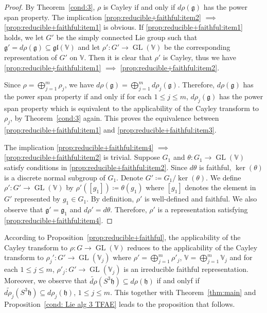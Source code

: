 \documentclass[11pt,reqno]{amsart}
\DeclareMathOperator{\GL}{GL}
\begin{document}
\begin{proof}
By Theorem~\ref{cond:3},  $\rho$ is Cayley if and only if $d \rho(\mathfrak{g})$ has the power span property.  The implication \eqref{prop:reducible+faithful:item2} $\implies$ \eqref{prop:reducible+faithful:item1} is obvious.  If \eqref{prop:reducible+faithful:item1} holds,  we let $G'$ be the simply connected Lie group such that $\mathfrak{g}' = d \rho(\mathfrak{g}) \subseteq \mathfrak{gl}(\mathbb{V})$ and let $\rho': G' \to \GL(\mathbb{V})$ be the corresponding representation of $G'$ on $\mathbb{V}$.  Then it is clear that $\rho'$ is Cayley,  thus we have \eqref{prop:reducible+faithful:item1} $\implies$ \eqref{prop:reducible+faithful:item2}.

Since $\rho = \bigoplus_{j=1}^m \rho_j$,  we have $d \rho (\mathfrak{g}) = \bigoplus_{j=1}^m d \rho_j (\mathfrak{g})$.  Therefore,  $d \rho(\mathfrak{g})$ has the power span property if and only if for each $1 \le j \le m$,  $d \rho_j (\mathfrak{g})$ has the power span property which is equivalent to the applicability of the Cayley transform to $\rho_j$,  by Theorem~\ref{cond:3} again.  This proves the equivalence between \eqref{prop:reducible+faithful:item1} and \eqref{prop:reducible+faithful:item3}.  

The implication \eqref{prop:reducible+faithful:item4} $\implies$ \eqref{prop:reducible+faithful:item2} is trivial.  Suppose $G_1$ and $\theta: G_1 \to \GL(\mathbb{V})$ satisfy conditions in \eqref{prop:reducible+faithful:item2}.  Since $d\theta$ is faithful,  $\ker(\theta)$ is a discrete normal subgroup of $G_1$.  Denote $G' \coloneqq G_1/\ker(\theta)$.  We define $\rho': G' \to \GL(\mathbb{V})$ by $\rho' \left( [g_1] \right) \coloneqq \theta(g_1)$ where $[g_1]$ denotes the element in $G'$ represented by $g_1 \in G_1$.  By definition,  $\rho'$ is well-defined and faithful.  We also observe that $\mathfrak{g}'=\mathfrak{g}_1$ and $d\rho' =d\theta$.  Therefore,  $\rho'$ is a representation satisfying \eqref{prop:reducible+faithful:item4}.
\end{proof}
According to Proposition~\ref{prop:reducible+faithful},  the applicability of the Cayley transform to $\rho: G\to \GL(\mathbb{V})$ reduces to the applicability of the Cayley transform to $\rho_j': G' \to \GL(\mathbb{V}_j)$ where $\rho' = \bigoplus_{j=1}^m \rho'_j$,  $\mathbb{V} = \bigoplus_{j=1}^m \mathbb{V}_j$ and for each $1 \le j \le m$,  $\rho'_j: G' \to \GL(\mathbb{V}_j)$ is an irreducible faithful representation.  Moreover,  we observe that $\widetilde{d\rho} \left( S^3 \mathfrak{h} \right) \subseteq d \rho (\mathfrak{h})$ if and onlyf if $\widetilde{d\rho_j} \left( S^3 \mathfrak{h} \right) \subseteq d \rho_j (\mathfrak{h})$,  $1 \le j \le m$.  This together with Theorem~\ref{thm:main} and Proposition~\ref{cond: Lie alg 3 TFAE}  leads to the proposition that follows.
\end{document}
